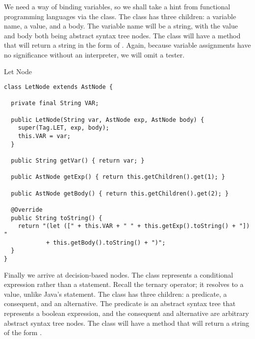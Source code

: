We need a way of binding variables, so we shall take a hint from functional programming languages via the  class. The  class has three children: a variable name, a value, and a body. The variable name will be a string, with the value and body both being abstract syntax tree nodes. The  class will have a  method that will return a string in the form of . Again, because variable assignments have no significance without an interpreter, we will omit a tester.

\begin{cl}{Let Node}
\begin{lstlisting}[language=MyJava]
class LetNode extends AstNode {

  private final String VAR;

  public LetNode(String var, AstNode exp, AstNode body) {
    super(Tag.LET, exp, body);
    this.VAR = var;
  }

  public String getVar() { return var; }

  public AstNode getExp() { return this.getChildren().get(1); }

  public AstNode getBody() { return this.getChildren().get(2); }

  @Override
  public String toString() {
    return "(let ([" + this.VAR + " " + this.getExp().toString() + "]) " 
            + this.getBody().toString() + ")";
  }
}
\end{lstlisting}
\end{cl}

Finally we arrive at decision-based nodes. The  class represents a conditional expression rather than a statement. Recall the ternary operator; it resolves to a value, unlike Java's  statement. The  class has three children: a predicate, a consequent, and an alternative. The predicate is an abstract syntax tree that represents a boolean expression, and the consequent and alternative are arbitrary abstract syntax tree nodes. The  class will have a  method that will return a string of the form .

